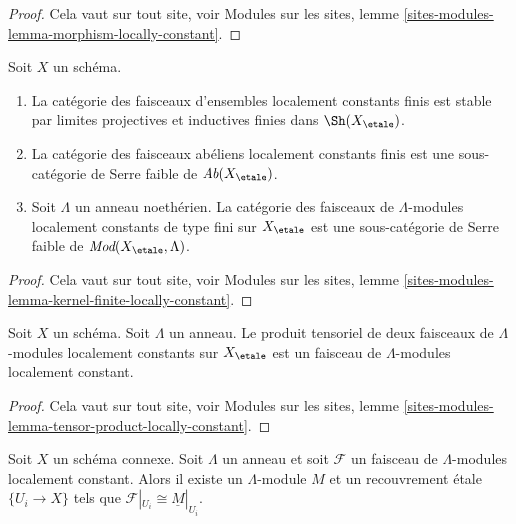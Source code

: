 \begin{proof}
Cela vaut sur tout site, voir
Modules sur les sites, lemme \ref{sites-modules-lemma-morphism-locally-constant}.
\end{proof}

\begin{lemma}
\label{lemma-kernel-finite-locally-constant}
Soit $X$ un sch\'ema.
\begin{enumerate}
\item La cat\'egorie des faisceaux d'ensembles localement constants finis
est stable par limites projectives et inductives finies dans $\Sh(X_\etale)$.
\item La cat\'egorie des faisceaux ab\'eliens localement constants finis est une
sous-cat\'egorie de Serre faible de $\textit{Ab}(X_\etale)$.
\item Soit $\Lambda$ un anneau noeth\'erien. La cat\'egorie des
faisceaux de $\Lambda$-modules localement constants de type fini sur
$X_\etale$ est une sous-cat\'egorie de Serre faible de
$\textit{Mod}(X_\etale, \Lambda)$.
\end{enumerate}
\end{lemma}

\begin{proof}
Cela vaut sur tout site, voir
Modules sur les sites, lemme
\ref{sites-modules-lemma-kernel-finite-locally-constant}.
\end{proof}

\begin{lemma}
\label{lemma-tensor-product-locally-constant}
Soit $X$ un sch\'ema. Soit $\Lambda$ un anneau.
Le produit tensoriel de deux faisceaux de $\Lambda$-modules localement constants
sur $X_\etale$ est un faisceau de $\Lambda$-modules localement constant.
\end{lemma}

\begin{proof}
Cela vaut sur tout site, voir
Modules sur les sites, lemme
\ref{sites-modules-lemma-tensor-product-locally-constant}.
\end{proof}

\begin{lemma}
\label{lemma-connected-locally-constant}
Soit $X$ un sch\'ema connexe. Soit $\Lambda$ un anneau et soit
$\mathcal{F}$ un faisceau de $\Lambda$-modules localement constant.
Alors il existe un $\Lambda$-module $M$ et un recouvrement \'etale
$\{U_i \to X\}$ tels que $\mathcal{F}|_{U_i} \cong \underline{M}|_{U_i}$.
\end{lemma}


